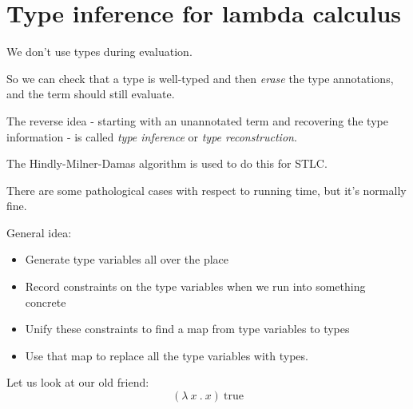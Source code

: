 
\section{Type inference for lambda calculus}

\begin{frame}
  We don't use types during evaluation.
\end{frame}

\begin{frame}
  So we can check that a type is well-typed and then {\it erase} the type
  annotations, and the term should still evaluate.
\end{frame}

\begin{frame}
  The reverse idea - starting with an unannotated term and recovering the type
  information - is called {\it type inference} or {\it type reconstruction}.
\end{frame}

\begin{frame}
  The Hindly-Milner-Damas algorithm is used to do this for STLC.
\end{frame}

\begin{frame}
  There are some pathological cases with respect to running time, but it's
  normally fine.
\end{frame}

\begin{frame}
  General idea:
  \begin{itemize}
  \pause
  \item <+-> Generate type variables all over the place
  \item <+-> Record constraints on the type variables when we run into something concrete
  \item <+-> Unify these constraints to find a map from type variables to types
  \item <+-> Use that map to replace all the type variables with types.
  \end{itemize}
\end{frame}

\begin{frame}
  Let us look at our old friend:
  \[\left( \lambda~x~.~x \right)~\text{true} \]
\end{frame}

